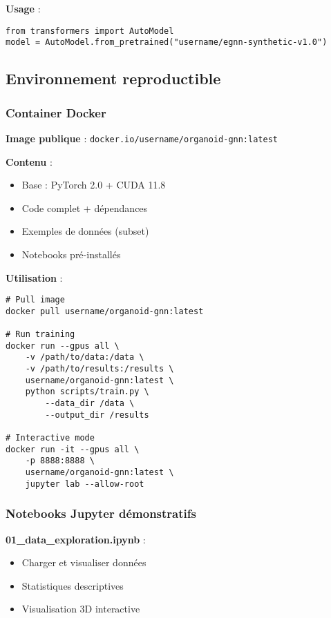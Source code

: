 \textbf{Usage} :
\begin{verbatim}
from transformers import AutoModel
model = AutoModel.from_pretrained("username/egnn-synthetic-v1.0")
\end{verbatim}

\subsection{Environnement reproductible}

\subsubsection{Container Docker}

\textbf{Image publique} : \texttt{docker.io/username/organoid-gnn:latest}

\textbf{Contenu} :
\begin{itemize}
    \item Base : PyTorch 2.0 + CUDA 11.8
    \item Code complet + dépendances
    \item Exemples de données (subset)
    \item Notebooks pré-installés
\end{itemize}

\textbf{Utilisation} :
\begin{verbatim}
# Pull image
docker pull username/organoid-gnn:latest

# Run training
docker run --gpus all \
    -v /path/to/data:/data \
    -v /path/to/results:/results \
    username/organoid-gnn:latest \
    python scripts/train.py \
        --data_dir /data \
        --output_dir /results

# Interactive mode
docker run -it --gpus all \
    -p 8888:8888 \
    username/organoid-gnn:latest \
    jupyter lab --allow-root
\end{verbatim}

\subsubsection{Notebooks Jupyter démonstratifs}

\textbf{01\_data\_exploration.ipynb} :
\begin{itemize}
    \item Charger et visualiser données
    \item Statistiques descriptives
    \item Visualisation 3D interactive
\end{itemize}

